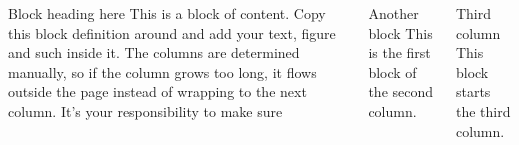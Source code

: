 \documentclass[final]{beamer}
\author{Author Name}
\begin{document}
\begin{frame}[t, fragile]
\begin{columns}[T]
\column{0.05\paperwidth}

\column{0.3\paperwidth}

\begin{block}{Block heading here}
This is a block of content. Copy this block definition around and add your text, figure and such inside it. The columns are determined manually, so if the column grows too long, it flows outside the page instead of wrapping to the next column. It's your responsibility to make sure 
\end{block}



\column{0.3\paperwidth}

\begin{block}{Another block}
This is the first block of the second column.
\end{block}


\column{0.3\paperwidth}

\begin{block}{Third column}
This block starts the third column.
\end{block}
	

\column{0.05\paperwidth} 
\end{columns}
\end{frame}
\end{document}
